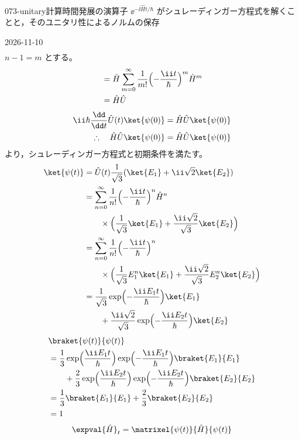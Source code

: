 \documentclass[uplatex,dvipdfmx,a4paper,11pt]{jsarticle}
\begin{document}
\begin{mondai}{073-unitary}{計算}{時間発展の演算子 $\ee^{-\ii\hat{H}t/\hbar}$ がシュレーディンガー方程式を解くことと，そのユニタリ性によるノルムの保存}
\begin{kotaeutsushi}{2026-11-10}
\begin{align*}
\end{align*}
$n-1=m$ とする。
\begin{align*}
&=\hat{H}\sum_{m=0}^{\infty}\frac{1}{m!}\Bigl(-\frac{\ii t}{\hbar}\Bigr)^{m}\hat{H}^{m}\\
&=\hat{H}\hat{U}
\end{align*}
\begin{align*}
\ii\hbar\frac{\dd}{\dd t}\hat{U}(t)\ket{\psi(0)}&=\hat{H}\hat{U}\ket{\psi(0)}\\
\therefore\quad\hat{H}\hat{U}\ket{\psi(0)}&=\hat{H}\hat{U}\ket{\psi(0)}
\end{align*}
より，シュレーディンガー方程式と初期条件を満たす。
\begin{align*}
\ket{\psi(t)}&=\hat{U}(t)\frac{1}{\sqrt{3}}(\ket{E_{1}}+\ii\sqrt{2}\ket{E_{2}})\\
&=\sum_{n=0}^{\infty}\frac{1}{n!}\Bigl(-\frac{\ii t}{\hbar}\Bigr)^{n}\hat{H}^{n}\\
&\qquad\times\Bigl(\frac{1}{\sqrt{3}}\ket{E_{1}}+\frac{\ii\sqrt{2}}{\sqrt{3}}\ket{E_{2}}\Bigr)\\
&=\sum_{n=0}^{\infty}\frac{1}{n!}\Bigl(-\frac{\ii t}{\hbar}\Bigr)^{n}\\
&\qquad\times\Bigl(\frac{1}{\sqrt{3}}E_{1}^{n}\ket{E_{1}}+\frac{\ii\sqrt{2}}{\sqrt{3}}E_{2}^{n}\ket{E_{2}}\Bigr)\\
&=\frac{1}{\sqrt{3}}\exp\Bigl(-\frac{\ii E_{1}t}{\hbar}\Bigr)\ket{E_{1}}\\
&\qquad+\frac{\ii\sqrt{2}}{\sqrt{3}}\exp\Bigl(-\frac{\ii E_{2}t}{\hbar}\Bigr)\ket{E_{2}}
\end{align*}
\begin{align*}
&\braket{\psi(t)}{\psi(t)}\\
&=\frac{1}{3}\exp\Bigl(\frac{\ii E_{1}t}{\hbar}\Bigr)\exp\Bigl(-\frac{\ii E_{1}t}{\hbar}\Bigr)\braket{E_{1}}{E_{1}}\\
&\qquad+\frac{2}{3}\exp\Bigl(\frac{\ii E_{2}t}{\hbar}\Bigr)\exp\Bigl(-\frac{\ii E_{2}t}{\hbar}\Bigr)\braket{E_{2}}{E_{2}}\\
&=\frac{1}{3}\braket{E_{1}}{E_{1}}+\frac{2}{3}\braket{E_{2}}{E_{2}}\\
&=1
\end{align*}
\begin{align*}
&\expval{\hat{H}}_{t}=\matrixel{\psi(t)}{\hat{H}}{\psi(t)}\\

\end{align*}
\end{kotaeutsushi}
\end{mondai}
\end{document}

